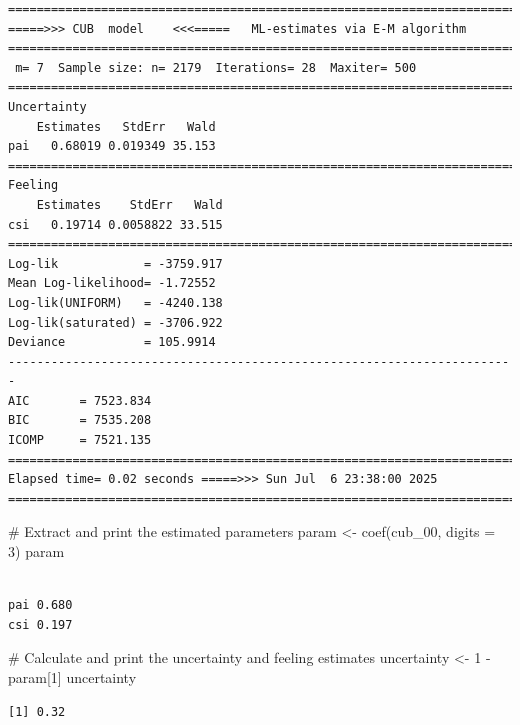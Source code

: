 \documentclass[
  letterpaper,
  DIV=11,
  numbers=noendperiod]{scrartcl}
\newenvironment{Shaded}{\begin{snugshade}}{\end{snugshade}}
\newcommand{\AttributeTok}[1]{\textcolor[rgb]{0.40,0.45,0.13}{#1}}
\newcommand{\CommentTok}[1]{\textcolor[rgb]{0.37,0.37,0.37}{#1}}
\newcommand{\DecValTok}[1]{\textcolor[rgb]{0.68,0.00,0.00}{#1}}
\newcommand{\FunctionTok}[1]{\textcolor[rgb]{0.28,0.35,0.67}{#1}}
\newcommand{\NormalTok}[1]{\textcolor[rgb]{0.00,0.23,0.31}{#1}}
\newcommand{\OtherTok}[1]{\textcolor[rgb]{0.00,0.23,0.31}{#1}}
\newcommand{\SpecialCharTok}[1]{\textcolor[rgb]{0.37,0.37,0.37}{#1}}
\begin{document}
\begin{verbatim}
======================================================================= 
=====>>> CUB  model    <<<=====   ML-estimates via E-M algorithm   
======================================================================= 
 m= 7  Sample size: n= 2179  Iterations= 28  Maxiter= 500 
======================================================================= 
Uncertainty                                            
    Estimates   StdErr   Wald
pai   0.68019 0.019349 35.153
======================================================================= 
Feeling                                            
    Estimates    StdErr   Wald
csi   0.19714 0.0058822 33.515
======================================================================= 
Log-lik            = -3759.917 
Mean Log-likelihood= -1.72552 
Log-lik(UNIFORM)   = -4240.138 
Log-lik(saturated) = -3706.922 
Deviance           = 105.9914 
----------------------------------------------------------------------- 
AIC       = 7523.834 
BIC       = 7535.208 
ICOMP     = 7521.135 
======================================================================= 
Elapsed time= 0.02 seconds =====>>> Sun Jul  6 23:38:00 2025 
======================================================================= 
\end{verbatim}

\begin{Shaded}
\begin{Highlighting}[]
\CommentTok{\# Extract and print the estimated parameters}
\NormalTok{param }\OtherTok{\textless{}{-}} \FunctionTok{coef}\NormalTok{(cub\_00, }\AttributeTok{digits =} \DecValTok{3}\NormalTok{)}
\NormalTok{param}
\end{Highlighting}
\end{Shaded}

\begin{verbatim}
         
pai 0.680
csi 0.197
\end{verbatim}

\begin{Shaded}
\begin{Highlighting}[]
\CommentTok{\# Calculate and print the uncertainty and feeling estimates}
\NormalTok{uncertainty }\OtherTok{\textless{}{-}} \DecValTok{1} \SpecialCharTok{{-}}\NormalTok{ param[}\DecValTok{1}\NormalTok{]}
\NormalTok{uncertainty}
\end{Highlighting}
\end{Shaded}

\begin{verbatim}
[1] 0.32
\end{verbatim}
\end{document}
